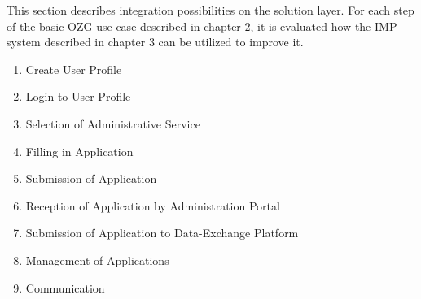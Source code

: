 

This section describes integration possibilities on the solution layer. For each step of the basic OZG use case described in chapter 2, it is evaluated how the IMP system described in chapter 3 can be utilized to improve it. 

\begin{enumerate}
    \item{Create User Profile}
    \item{Login to User Profile}
    \item{Selection of Administrative Service}
    \item{Filling in Application}
    \item{Submission of Application}
    \item{Reception of Application by Administration Portal}
    \item{Submission of Application to Data-Exchange Platform}
    \item{Management of Applications}
    \item{Communication}
\end{enumerate}


